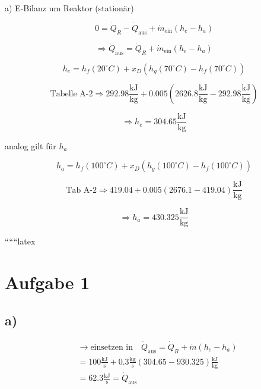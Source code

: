 a) E-Bilanz um Reaktor (stationär)

\[
0 = \dot{Q}_R - \dot{Q}_{\text{aus}} + \dot{m}_{\text{ein}} (h_e - h_a)
\]

\[
\Rightarrow \dot{Q}_{\text{aus}} = \dot{Q}_R + \dot{m}_{\text{ein}} (h_e - h_a)
\]

\[
h_e = h_f (20^\circ C) + x_D (h_g (70^\circ C) - h_f (70^\circ C))
\]

\[
\text{Tabelle A-2} \Rightarrow 292.98 \frac{\text{kJ}}{\text{kg}} + 0.005 (2626.8 \frac{\text{kJ}}{\text{kg}} - 292.98 \frac{\text{kJ}}{\text{kg}})
\]

\[
\Rightarrow h_e = 304.65 \frac{\text{kJ}}{\text{kg}}
\]

analog gilt für $h_a$

\[
h_a = h_f (100^\circ C) + x_D (h_g (100^\circ C) - h_f (100^\circ C))
\]

\[
\text{Tab A-2} \Rightarrow 419.04 + 0.005 (2676.1 - 419.04) \frac{\text{kJ}}{\text{kg}}
\]

\[
\Rightarrow h_a = 430.325 \frac{\text{kJ}}{\text{kg}}
\]

``````latex


\section*{Aufgabe 1}



\subsection*{a)}
\begin{align*}
&\rightarrow \text{einsetzen in} \quad \dot{Q}_{\text{aus}} = \dot{Q}_R + \dot{m} (h_e - h_a) \\
&= 100 \frac{\text{kJ}}{\text{s}} + 0.3 \frac{\text{kg}}{\text{s}} \left( 304.65 - 930.325 \right) \frac{\text{kJ}}{\text{kg}} \\
&= 62.3 \frac{\text{kJ}}{\text{s}} = \dot{Q}_{\text{aus}}
\end{align*}